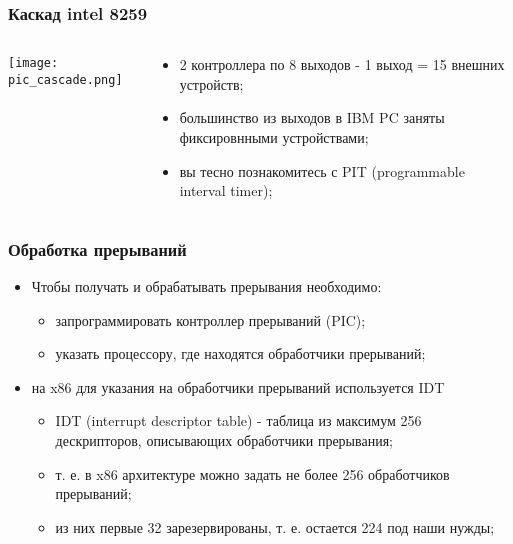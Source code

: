 \begin{frame}
\frametitle{Каскад intel 8259}
\begin{columns}
  \begin{column}{0.5\textwidth}
  \begin{center}
    \texttt{[image: pic\_cascade.png]}
  \end{center}
  \end{column}
  \begin{column}{0.5\textwidth}
  \begin{itemize}
    \item 2 контроллера по 8 выходов - 1 выход = 15 внешних устройств;
    \item большинство из выходов в IBM PC заняты фиксировнными устройствами;
    \item вы тесно познакомитесь с PIT (programmable interval timer);
  \end{itemize}
  \end{column}
\end{columns}
\end{frame}

\begin{frame}
\frametitle{Обработка прерываний}
\begin{itemize}
  \item Чтобы получать и обрабатывать прерывания необходимо:
  \begin{itemize}
    \item запрограммировать контроллер прерываний (PIC);
    \item указать процессору, где находятся обработчики прерываний;
  \end{itemize}
  \item на x86 для указания на обработчики прерываний используется IDT
  \begin{itemize}
    \item IDT (interrupt descriptor table) - таблица из максимум 256
    дескрипторов, описывающих обработчики прерывания;
    \item т. е. в x86 архитектуре можно задать не более 256 обработчиков
    прерываний;
    \item из них первые 32 зарезервированы, т. е. остается 224 под наши нужды;
  \end{itemize}
\end{itemize}
\end{frame}

